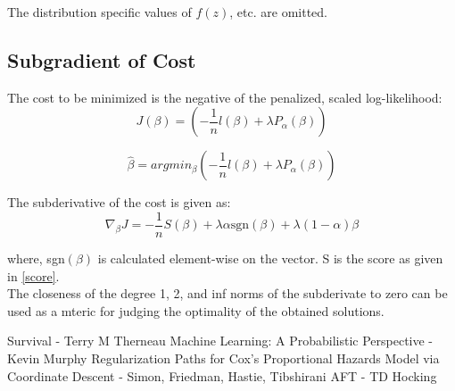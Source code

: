 \documentclass[12pt,a4paper]{report}
\begin{document}
The distribution specific values of $f(z)$, etc. are omitted.

\clearpage
\subsection*{Subgradient of Cost}
The cost to be minimized is the negative of the penalized, scaled log-likelihood:
\begin{equation} \label{cost}
  J(\beta) =  \left(-\frac{1}{n} l(\beta) + \lambda P_{\alpha}(\beta) \right)
\end{equation}


\begin{equation}
  \hat \beta = argmin_{\beta} \left(-\frac{1}{n} l(\beta) + \lambda P_{\alpha}(\beta) \right)
\end{equation}

The subderivative of the cost is given as:
\begin{equation} \label{subgrad_cost}
\nabla_{\beta} J = -\frac{1}{n} S(\beta) + \lambda \alpha \mbox{sgn}(\beta) 
                                       + \lambda (1-\alpha) \beta
\end{equation}

where, sgn$(\beta)$ is calculated element-wise on the vector. S is the score as given in \ref{score}. \\


\vspace{4mm}
The closeness of the degree 1, 2, and inf norms of the subderivate to zero can be used as a mteric for judging the optimality of the obtained solutions.

\begin{thebibliography}{1}
 Survival - Terry M Therneau
 Machine Learning: A Probabilistic Perspective - Kevin Murphy
 Regularization Paths for Cox's Proportional Hazards Model via Coordinate Descent - Simon, Friedman, Hastie, Tibshirani
 AFT - TD Hocking
\end{thebibliography}
\end{document}
